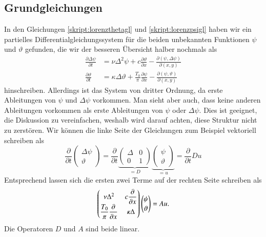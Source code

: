 \subsection{Grundgleichungen}
In den Gleichungen
\eqref{skript:lorenzthetagl}
und
\eqref{skript:lorenzpsigl}
haben wir ein partielles Differentialgleichungssystem für die beiden 
unbekannten Funktionen $\psi$ und $\vartheta$ gefunden, die wir
der besseren Übersicht halber nochmals als
\begin{equation}
\begin{aligned}
\frac{\partial\Delta\psi}{\partial t}
&=
\nu\Delta^2\psi 
+c\frac{\partial\vartheta}{\partial x}
-\frac{\partial(\psi,\Delta\psi)}{\partial(x,y)}
\\
\frac{\partial\vartheta}{\partial t}
&=
\kappa\Delta\vartheta
+\frac{T_0}{\pi}\frac{\partial\psi}{\partial x}
-
\frac{\partial(\psi,\vartheta)}{\partial(x,y)}
\end{aligned}
\label{skript:lorenzausgangsgleichung}
\end{equation}
hinschreiben.
Allerdings ist das System von dritter Ordnung, da erste Ableitungen von
$\psi$ und $\Delta\psi$ vorkommen.
Man sieht aber auch, dass keine anderen Ableitungen vorkommen als erste
Ableitungen von $\psi$ oder $\Delta\psi$.
Dies ist geeignet, die Diskussion zu vereinfachen, weshalb wird darauf
achten, diese Struktur nicht zu zerstören.
Wir können die linke Seite der Gleichungen zum Beispiel vektoriell schreiben
als
\[
\frac{\partial}{\partial t}
\begin{pmatrix}
\Delta\psi\\\vartheta
\end{pmatrix}
=
\frac{\partial}{\partial t}
\underbrace{
\begin{pmatrix}
\Delta &  0 \\
   0   &  1
\end{pmatrix}
}_{\displaystyle=D}
\underbrace{
\begin{pmatrix}
\psi\\\vartheta
\end{pmatrix}
}_{\displaystyle=u}
=
\frac{\partial}{\partial t} Du
\]
Entsprechend lassen sich die ersten zwei Terme auf der rechten Seite 
schreiben als
\[
\def\arraystretch{1.1}
\begin{pmatrix}
\nu\Delta^2     & \displaystyle c\frac{\partial}{\partial x}\\
\displaystyle \frac{T_0}{\pi}\frac{\partial}{\partial x}    &\kappa\Delta
\end{pmatrix}
\begin{pmatrix}
\psi\\\vartheta
\end{pmatrix}
=
Au.
\]
Die Operatoren $D$ und $A$ sind beide linear.

